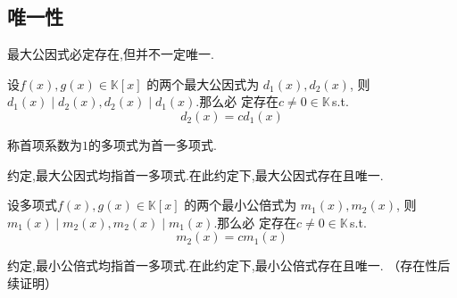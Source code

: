 \subsection{唯一性}
\begin{red}
\begin{remark}
    最大公因式必定存在,但并不一定唯一.
\end{remark}
\end{red}
\begin{formal}
\begin{theorem}[最大公因式不唯一]\label{thm:最大公因式不唯一}
    设$f\left(x\right),g\left(x\right)\in\mathbb{K}\left[x\right]$
    的两个最大公因式为
    $d_1\left(x\right),d_2\left(x\right)$,
    则$d_1\left(x\right)\mid
    d_2\left(x\right),d_2
    \left(x\right)\mid d_1\left(x\right)$.那么必
    定存在$c\neq 0\in\mathbb{K}$\,\textup{s.t.}
    \[d_2\left(x\right)=cd_1\left(x\right)\]
\end{theorem}
\end{formal}
\begin{formal}
\begin{definition}[首一多项式]\label{def:首一多项式}
    称首项系数为$1$的多项式为首一多项式.
\end{definition}
\end{formal}
\begin{red}
\begin{remark}
    约定,最大公因式均指首一多项式.在此约定下,最大公因式存在且唯一.
\end{remark}
\end{red}
\begin{formal}
\begin{theorem}[最小公倍式不唯一]\label{thm:最小公倍式不唯一}
    设多项式$f\left(x\right),g\left(x\right)\in\mathbb{K}\left[x\right]$
    的两个最小公倍式为
    $m_1\left(x\right),m_2\left(x\right)$,
    则$m_1\left(x\right)\mid 
    m_2\left(x\right),m_2
    \left(x\right)\mid m_1\left(x\right)$.那么必
    定存在$c\neq 0\in\mathbb{K}$\,\textup{s.t.}
    \[m_2\left(x\right)=cm_1\left(x\right)\]
\end{theorem}
\end{formal}
\begin{red}
\begin{remark}
    约定,最小公倍式均指首一多项式.在此约定下,最小公倍式存在且唯一.
    （存在性后续证明）
\end{remark}
\end{red}
